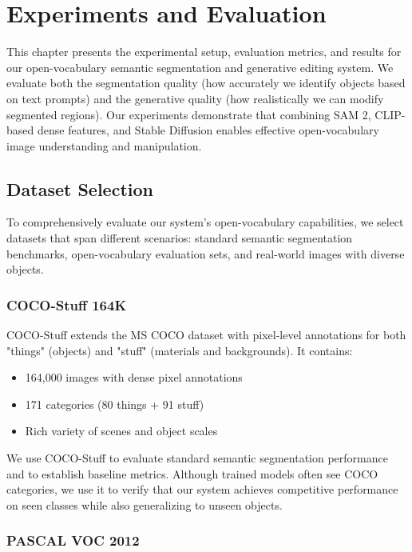 \chapter{Experiments and Evaluation}

This chapter presents the experimental setup, evaluation metrics, and results for our open-vocabulary semantic segmentation and generative editing system. We evaluate both the segmentation quality (how accurately we identify objects based on text prompts) and the generative quality (how realistically we can modify segmented regions). Our experiments demonstrate that combining SAM 2, CLIP-based dense features, and Stable Diffusion enables effective open-vocabulary image understanding and manipulation.

\section{Dataset Selection}

To comprehensively evaluate our system's open-vocabulary capabilities, we select datasets that span different scenarios: standard semantic segmentation benchmarks, open-vocabulary evaluation sets, and real-world images with diverse objects.

\subsection{COCO-Stuff 164K}

COCO-Stuff \cite{lin2014microsoft} extends the MS COCO dataset with pixel-level annotations for both "things" (objects) and "stuff" (materials and backgrounds). It contains:
\begin{itemize}
    \item 164,000 images with dense pixel annotations
    \item 171 categories (80 things + 91 stuff)
    \item Rich variety of scenes and object scales
\end{itemize}

We use COCO-Stuff to evaluate standard semantic segmentation performance and to establish baseline metrics. Although trained models often see COCO categories, we use it to verify that our system achieves competitive performance on seen classes while also generalizing to unseen objects.

\subsection{PASCAL VOC 2012}


